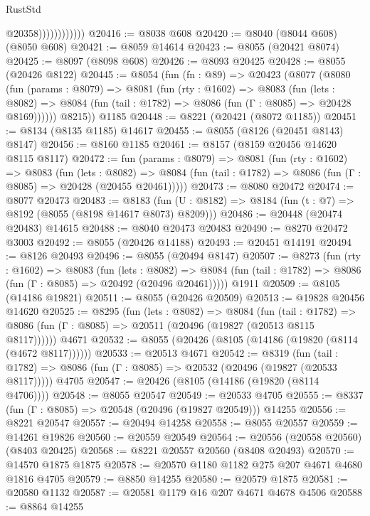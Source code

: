 \begin{lexlean}{RustStd}
\begin{coremodule}
                            @20358))))))))))))
@20416 := @8038 @608
@20420 := @8040 (@8044 @608) (@8050 @608)
@20421 := @8059 @14614
@20423 := @8055 (@20421 @8074)
@20425 := @8097 (@8098 @608)
@20426 := @8093 @20425
@20428 := @8055 (@20426 @8122)
@20445 := @8054
    (fun (fn : @89) =>
    @20423
      (@8077
        (@8080
          (fun (params : @8079) =>
          @8081
            (fun (rty : @1602) =>
            @8083
              (fun (lets : @8082) =>
              @8084 (fun (tail : @1782) => @8086 (fun (Γ : @8085) => @20428 @8169))))))
        @8215))
    @1185
@20448 := @8221 (@20421 (@8072 @1185))
@20451 := @8134 (@8135 @1185) @14617
@20455 := @8055 (@8126 (@20451 @8143) @8147)
@20456 := @8160 @1185
@20461 := @8157 (@8159 @20456 @14620 @8115 @8117)
@20472 := fun (params : @8079) =>
  @8081
    (fun (rty : @1602) =>
    @8083
      (fun (lets : @8082) =>
      @8084 (fun (tail : @1782) => @8086 (fun (Γ : @8085) => @20428 (@20455 @20461)))))
@20473 := @8080 @20472
@20474 := @8077 @20473
@20483 := @8183
    (fun (U : @8182) => @8184 (fun (t : @7) => @8192 (@8055 (@8198 @14617 @8073) @8209)))
@20486 := @20448 (@20474 @20483) @14615
@20488 := @8040 @20473 @20483
@20490 := @8270 @20472 @3003
@20492 := @8055 (@20426 @14188)
@20493 := @20451 @14191
@20494 := @8126 @20493
@20496 := @8055 (@20494 @8147)
@20507 := @8273
    (fun (rty : @1602) =>
    @8083
      (fun (lets : @8082) =>
      @8084 (fun (tail : @1782) => @8086 (fun (Γ : @8085) => @20492 (@20496 @20461)))))
    @1911
@20509 := @8105 (@14186 @19821)
@20511 := @8055 (@20426 @20509)
@20513 := @19828 @20456 @14620
@20525 := @8295
    (fun (lets : @8082) =>
    @8084
      (fun (tail : @1782) =>
      @8086 (fun (Γ : @8085) => @20511 (@20496 (@19827 (@20513 @8115 @8117))))))
    @4671
@20532 := @8055 (@20426 (@8105 (@14186 (@19820 (@8114 (@4672 @8117))))))
@20533 := @20513 @4671
@20542 := @8319
    (fun (tail : @1782) => @8086 (fun (Γ : @8085) => @20532 (@20496 (@19827 (@20533 @8117)))))
    @4705
@20547 := @20426 (@8105 (@14186 (@19820 (@8114 @4706))))
@20548 := @8055 @20547
@20549 := @20533 @4705
@20555 := @8337 (fun (Γ : @8085) => @20548 (@20496 (@19827 @20549))) @14255
@20556 := @8221 @20547
@20557 := @20494 @14258
@20558 := @8055 @20557
@20559 := @14261 @19826
@20560 := @20559 @20549
@20564 := @20556 (@20558 @20560) (@8403 @20425)
@20568 := @8221 @20557 @20560 (@8408 @20493)
@20570 := @14570 @1875 @1875
@20578 := @20570 @1180 @1182 @275 @207 @4671 @4680 @1816 @4705
@20579 := @8850 @14255
@20580 := @20579 @1875
@20581 := @20580 @1132
@20587 := @20581 @1179 @16 @207 @4671 @4678 @4506
@20588 := @8864 @14255

\end{coremodule}
\end{lexlean}
